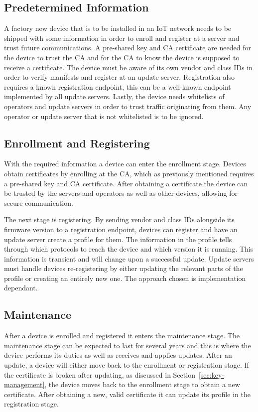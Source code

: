 \documentclass[0-thesis.tex]{subfiles}
\begin{document}
\subsection{Predetermined Information}
\label{sec:predetermined-information}
A factory new device that is to be installed in an IoT network needs to be shipped with
some information in order to enroll and register at a server and trust future
communications. A pre-shared key and CA certificate are needed for the device to trust the
CA and for the CA to know the device is supposed to receive a certificate. The device must
be aware of its own vendor and class IDs in order to verify manifests and register at an
update server. Registration also requires a known registration endpoint, this can be a
well-known endpoint implemented by all update servers. Lastly, the device needs whitelists
of operators and update servers in order to trust traffic originating from them. Any
operator or update server that is not whitelisted is to be ignored.

\subsection{Enrollment and Registering}
\label{sec:enrollment-registering}
With the required information a device can enter the enrollment stage. Devices obtain
certificates by enrolling at the CA, which as previously mentioned requires a pre-shared
key and CA certificate. After obtaining a certificate the device can be trusted by the
servers and operators as well as other devices, allowing for secure communication.

The next stage is registering. By sending vendor and class IDs alongside its firmware
version to a registration endpoint, devices can register and have an update server create
a profile for them. The information in the profile tells through which protocols to reach
the device and which version it is running. This information is transient and will change
upon a successful update. Update servers must handle devices re-registering by either
updating the relevant parts of the profile or creating an entirely new one. The approach
chosen is implementation dependant.

\subsection{Maintenance}
\label{sec:maintenance}
After a device is enrolled and registered it enters the maintenance stage. The maintenance
stage can be expected to last for several years and this is where the device performs its
duties as well as receives and applies updates. After an update, a device will either move
back to the enrollment or registration stage. If the certificate is broken after updating,
as discussed in Section~\ref{sec:key-management}, the device moves back to the enrollment
stage to obtain a new certificate. After obtaining a new, valid certificate it can update
its profile in the registration stage. 
\end{document}
